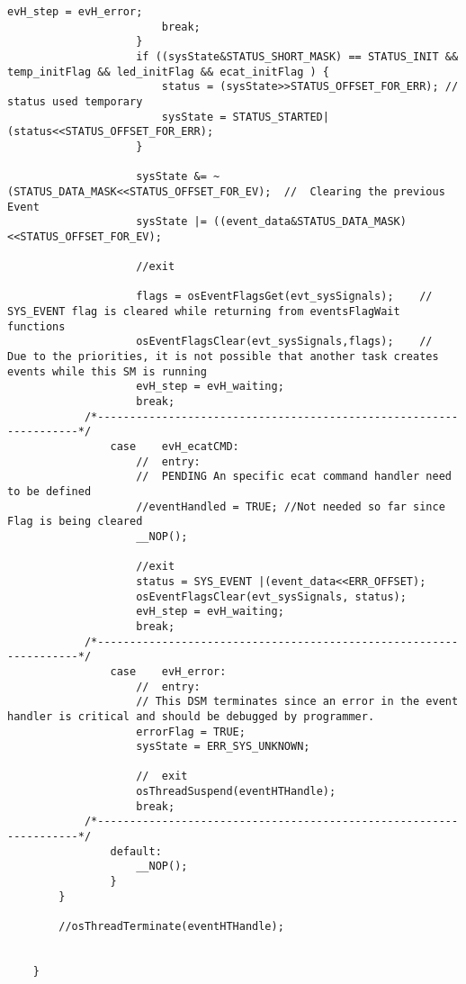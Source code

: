 \begin{lstlisting}[label=lst:event,caption={Main source code for Event Handler DSM.}]
                        evH_step = evH_error;
                        break;
                    }
                    if ((sysState&STATUS_SHORT_MASK) == STATUS_INIT && temp_initFlag && led_initFlag && ecat_initFlag ) {
                        status = (sysState>>STATUS_OFFSET_FOR_ERR);	//	status used temporary
                        sysState = STATUS_STARTED|(status<<STATUS_OFFSET_FOR_ERR);
                    }
    
                    sysState &= ~(STATUS_DATA_MASK<<STATUS_OFFSET_FOR_EV);	//	Clearing the previous Event
                    sysState |= ((event_data&STATUS_DATA_MASK)<<STATUS_OFFSET_FOR_EV);
    
                    //exit
    
                    flags = osEventFlagsGet(evt_sysSignals);	//	SYS_EVENT flag is cleared while returning from eventsFlagWait functions
                    osEventFlagsClear(evt_sysSignals,flags);	//	Due to the priorities, it is not possible that another task creates events while this SM is running
                    evH_step = evH_waiting;
                    break;
            /*-------------------------------------------------------------------*/
                case	evH_ecatCMD:
                    //	entry:
                    //	PENDING An specific ecat command handler need to be defined
                    //eventHandled = TRUE; //Not needed so far since Flag is being cleared
                    __NOP();
    
                    //exit
                    status = SYS_EVENT |(event_data<<ERR_OFFSET);
                    osEventFlagsClear(evt_sysSignals, status);
                    evH_step = evH_waiting;
                    break;
            /*-------------------------------------------------------------------*/
                case	evH_error:
                    //	entry:
                    // This DSM terminates since an error in the event handler is critical and should be debugged by programmer.
                    errorFlag = TRUE;
                    sysState = ERR_SYS_UNKNOWN;
    
                    //	exit
                    osThreadSuspend(eventHTHandle);
                    break;
            /*-------------------------------------------------------------------*/
                default:
                    __NOP();
                }
        }
    
        //osThreadTerminate(eventHTHandle);
    
    
    }
\end{lstlisting}

